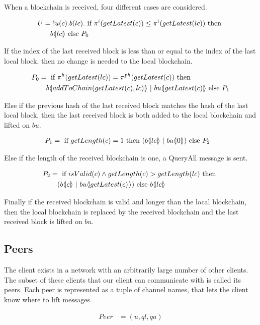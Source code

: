 When a blockchain is received, four different cases are considered.

\begin{align*}
	U &=\ !u(c).b(lc).\text{ if }\pi^{i}( getLatest(c)) \leq \pi^{i}(getLatest(lc))\text{ then }\\
	&\quad b \langle \! | lc | \! \rangle\text{ else }P_0
\end{align*}

If the index of the last received block is less than or equal to the index of the last local block, then no change is needed to the local blockchain.

\begin{align*}
	P_0 &=\If{\pi^{h}(getLatest(lc))=\pi^{ph}(getLatest(c))}{\\
	&\quad b\lift{}{addToChain(getLatest(c),lc)}\ | \ bu\lift{}{getLatest(c)}}{P_1}
\end{align*}

Else if the previous hash of the last received block matches the hash of the last local block, then the last received block is both added to the local blockchain and lifted on $bu$.

\begin{align*}
	P_1 &=\text{ if }getLength(c)=1\text{ then }(b \langle \! | lc | \! \rangle\ |\ ba  \langle \! | 0 | \! \rangle)\text{ else }P_2
\end{align*}

Else if the length of the received blockchain is one, a QueryAll message is sent.

\begin{align*}
	P_2 &=\text{ if }isValid(c) \land getLength(c) > getLength(lc)\text{ then }\\
	&\quad(b \langle \! | c | \! \rangle\ |\ bu  \langle \! | getLatest(c) | \! \rangle)\text{ else }b \langle \! | lc | \! \rangle
\end{align*}

Finally if the received blockchain is valid and longer than the local blockchain, then the local blockchain is replaced by the received blockchain and the last received block is lifted on $bu$.

\subsection{Peers}
The client exists in a network with an arbitrarily large number of other clients.
The subset of these clients that our client can communicate with is called its peers.
Each peer is represented as a tuple of channel names, that lets the client know where to lift messages.

\begin{align*}
    Peer &= (u, ql, qa)
\end{align*}

